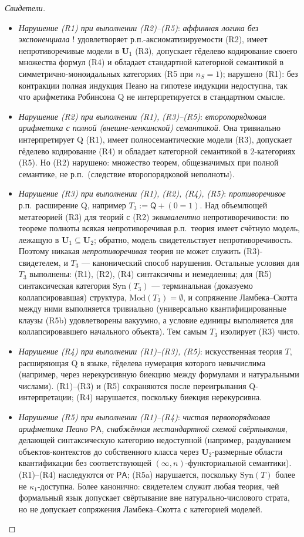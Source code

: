 \documentclass[11pt]{article}
\theoremstyle{plain}
\theoremstyle{definition}
\newcommand{\Syn}{\mathrm{Syn}}
\newcommand{\Mod}{\mathrm{Mod}}
\begin{document}
\begin{proof}[Свидетели]
\begin{itemize}[nosep]
\item \emph{Нарушение (R1) при выполнении (R2)--(R5)}: \emph{аффинная логика без экспоненциала $!$} удовлетворяет р.п.-аксиоматизируемости (R2), имеет непротиворечивые модели в $\mathbf{U}_1$ (R3), допускает гёделево кодирование своего множества формул (R4) и обладает стандартной категорной семантикой в симметрично-моноидальных категориях (R5 при $n_S = 1$); нарушено (R1): без контракции полная индукция Пеано на гипотезе индукции недоступна, так что арифметика Робинсона Q не интерпретируется в стандартном смысле.
\item \emph{Нарушение (R2) при выполнении (R1), (R3)--(R5)}: \emph{второпорядковая арифметика с полной (внешне-хенкинской) семантикой}. Она тривиально интерпретирует Q (R1), имеет полносемантические модели (R3), допускает гёделево кодирование (R4) и обладает категорной семантикой в $2$-категориях (R5). Но (R2) нарушено: множество теорем, общезначимых при полной семантике, не р.п.\ (следствие второпорядковой неполноты).
\item \emph{Нарушение (R3) при выполнении (R1), (R2), (R4), (R5)}: \emph{противоречивое} р.п.\ расширение Q, например $T_3 := \mathsf{Q} + (0 = 1)$. Над объемлющей метатеорией (R3) для теорий с (R2) \emph{эквивалентно} непротиворечивости: по теореме полноты всякая непротиворечивая р.п.\ теория имеет счётную модель, лежащую в $\mathbf{U}_1 \subseteq \mathbf{U}_2$; обратно, модель свидетельствует непротиворечивость. Поэтому никакая \emph{непротиворечивая} теория не может служить (R3)-свидетелем, и $T_3$ — канонический способ нарушения. Остальные условия для $T_3$ выполнены: (R1), (R2), (R4) синтаксичны и немедленны; для (R5) синтаксическая категория $\Syn(T_3)$ — терминальная (доказуемо коллапсировавшая) структура, $\Mod(T_3) = \emptyset$, и сопряжение Ламбека--Скотта между ними выполняется тривиально (универсально квантифицированные клаузы (R5b) удовлетворены вакуумно, а условие единицы выполняется для коллапсировавшего начального объекта). Тем самым $T_3$ изолирует (R3) чисто.
\item \emph{Нарушение (R4) при выполнении (R1)--(R3), (R5)}: искусственная теория $T$, расширяющая Q в языке, гёделева нумерация которого невычислима (например, через нерекурсивную биекцию между формулами и натуральными числами). (R1)--(R3) и (R5) сохраняются после переигрывания Q-интерпретации; (R4) нарушается, поскольку биекция нерекурсивна.
\item \emph{Нарушение (R5) при выполнении (R1)--(R4)}: \emph{чистая первопорядковая арифметика Пеано $\mathsf{PA}$, снабжённая нестандартной схемой свёртывания}, делающей синтаксическую категорию недоступной (например, раздуванием объектов-контекстов до собственного класса через $\mathbf{U}_2$-размерные области квантификации без соответствующей $(\infty, n)$-функториальной семантики). (R1)--(R4) наследуются от $\mathsf{PA}$; (R5a) нарушается, поскольку $\Syn(T)$ более не $\kappa_1$-доступна. Более канонично: свидетелем служит любая теория, чей формальный язык допускает свёртывание вне натурально-числового страта, но не допускает сопряжения Ламбека--Скотта с категорией моделей.

\end{itemize}
\end{proof}
\end{document}
